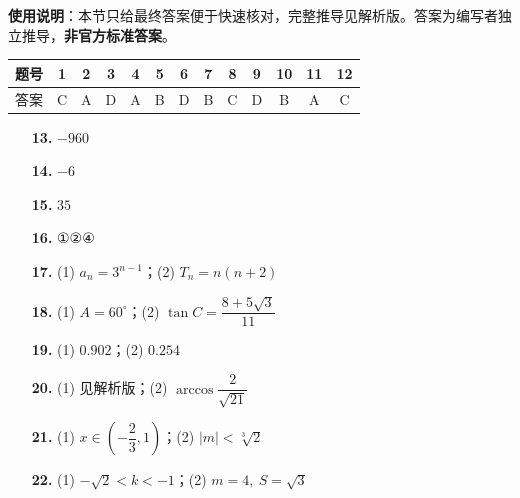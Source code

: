 
\begin{gknotice}
\textbf{使用说明}：本节只给最终答案便于快速核对，完整推导见解析版。答案为编写者独立推导，\textbf{非官方标准答案}。
\end{gknotice}

\begin{center}\begin{tabular}{ccccccccccccc}
\toprule
题号 & 1 & 2 & 3 & 4 & 5 & 6 & 7 & 8 & 9 & 10 & 11 & 12 \\
\midrule
答案 & C & A & D & A & B & D & B & C & D & B & A & C \\
\bottomrule
\end{tabular}\end{center}

\begin{itemize}[leftmargin=2.6em]
  \item[\textbf{13.}] $-960$
  \item[\textbf{14.}] $-6$
  \item[\textbf{15.}] $35$
  \item[\textbf{16.}] ①②④
\end{itemize}

\begin{itemize}[leftmargin=2.6em]
  \item[\textbf{17.}] (1) $a_n=3^{n-1}$；(2) $T_n=n(n+2)$
  \item[\textbf{18.}] (1) $A=60^\circ$；(2) $\tan C=\dfrac{8+5\sqrt3}{11}$
  \item[\textbf{19.}] (1) $0.902$；(2) $0.254$
  \item[\textbf{20.}] (1) 见解析版；(2) $\arccos\dfrac2{\sqrt{21}}$
  \item[\textbf{21.}] (1) $x\in\left(-\dfrac23,1\right)$；(2) $|m|<\sqrt[3]{2}$
  \item[\textbf{22.}] (1) $-\sqrt2<k<-1$；(2) $m=4,\ S=\sqrt3$
\end{itemize}
